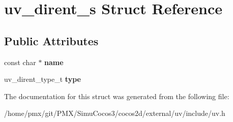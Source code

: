\hypertarget{structuv__dirent__s}{}\section{uv\+\_\+dirent\+\_\+s Struct Reference}
\label{structuv__dirent__s}
\subsection*{Public Attributes}
\begin{DoxyCompactItemize}
\item 
\mbox{\label{structuv__dirent__s_aad1b480800ccab684153290755baa047}} 
const char $\ast$ {\bfseries name}
\item 
\mbox{\label{structuv__dirent__s_aa54978584ef03a77b4c3027909da772a}} 
uv\+\_\+dirent\+\_\+type\+\_\+t {\bfseries type}
\end{DoxyCompactItemize}


The documentation for this struct was generated from the following file\+:\begin{DoxyCompactItemize}
\item 
/home/pmx/git/\+P\+M\+X/\+Simu\+Cocos3/cocos2d/external/uv/include/uv.\+h\end{DoxyCompactItemize}
